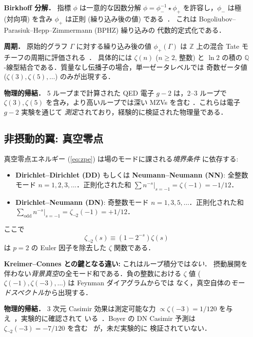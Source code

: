 \documentclass[11pt,a4paper]{article}
\begin{document}
\textbf{Birkhoff 分解．}
指標 $\phi$ は一意的な因数分解
$\phi = \phi_-^{-1} \star \phi_+$ を許容し，$\phi_-$ は極 (対向項)
を含み $\phi_+$ は正則 (繰り込み後の値) である~\cite{CK2000}．
これは Bogoliubov--Parasiuk--Hepp--Zimmermann (BPHZ) 繰り込みの
代数的定式化である．

\textbf{周期．}
原始的グラフ $\Gamma$ に対する繰り込み後の値 $\phi_+(\Gamma)$ は
$\mathbb{Z}$ 上の混合 Tate モチーフの周期に評価される~\cite{Brown2015}．
具体的には $\zeta(n)$ ($n \geq 2$, 整数) と $\ln 2$ の積の
$\mathbb{Q}$-線型結合である．質量なし伝播子の場合，単一ゼータレベルでは
奇数ゼータ値 ($\zeta(3), \zeta(5), \ldots$) のみが出現する．

\textbf{物理的帰結．}
5 ループまで計算された QED 電子 $g-2$ は，2--3 ループで
$\zeta(3), \zeta(5)$ を含み，より高いループでは深い MZVs を含む
\cite{Laporta2017,Aoyama2020}．これらは電子 $g-2$ 実験を通じて
\emph{測定}されており，経験的に検証された物理量である．

\subsection{非摂動的翼: 真空零点}

真空零点エネルギー (\ref{eq:zpe}) は場のモードに課される\emph{境界条件}
に依存する:

\begin{itemize}
\item \textbf{Dirichlet--Dirichlet (DD)} もしくは
\textbf{Neumann--Neumann (NN)}:
全整数モード $n = 1, 2, 3, \ldots$．正則化された和
$\sum n^{-s}|_{s=-1} = \zeta(-1) = -1/12$．

\item \textbf{Dirichlet--Neumann (DN)}:
奇整数モード $n = 1, 3, 5, \ldots$．正則化された和
$\sum_{\text{odd}} n^{-s}|_{s=-1} = \zeta_{\neg 2}(-1) = +1/12$．
\end{itemize}

ここで
\begin{equation}
\zeta_{\neg 2}(s) \equiv (1 - 2^{-s})\zeta(s)
\end{equation}
は $p = 2$ の Euler 因子を除去した $\zeta$ 関数である．

\textbf{Kreimer--Connes との鍵となる違い:} これはループ積分では\emph{ない}．
摂動展開を伴わない\emph{背景真空}の全モード和である．負の整数における
$\zeta$ 値 ($\zeta(-1), \zeta(-3), \ldots$) は Feynman ダイアグラムからでは
なく，真空自体の\emph{モードスペクトル}から出現する．

\textbf{物理的帰結．} 3 次元 Casimir 効果は測定可能な力
$\propto \zeta(-3) = 1/120$ を与え~\cite{Casimir1948}，実験的に確認されて
いる~\cite{Lamoreaux1997}．Boyer の DN Casimir 予測は
$\zeta_{\neg 2}(-3) = -7/120$ を含む~\cite{Boyer1974} が，未だ実験的に
検証されていない．
\end{document}

